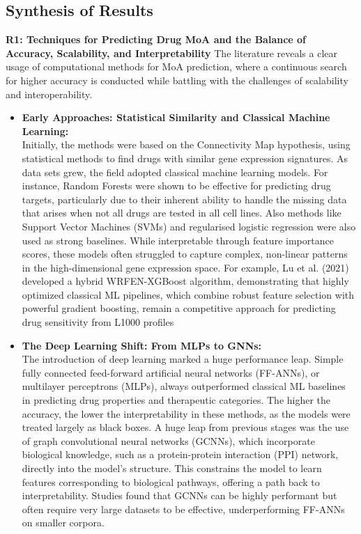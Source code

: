\documentclass[twocolumn]{article}
\begin{document}
\subsection{Synthesis of Results}
\textbf{R1: Techniques for Predicting Drug MoA and the Balance of Accuracy, Scalability, and Interpretability}
The literature reveals a clear usage of computational methods for MoA prediction, where a continuous search for higher accuracy is conducted while battling with the challenges of scalability and interoperability.
    \begin{itemize}
        \item \textbf{Early Approaches: Statistical Similarity and Classical Machine Learning:}
        \\
        Initially, the methods were based on the Connectivity Map hypothesis, using statistical methods to find drugs with similar gene expression signatures\cite{subramanian2017next,el2017integrative,liao2023open}. As data sets grew, the field adopted classical machine learning models. For instance, Random Forests were shown to be effective for predicting drug targets, particularly due to their inherent ability to handle the missing data that arises when not all drugs are tested in all cell lines\cite{mcdermott2019deep,subramanian2017next,duan2016l1000cds2}. Also methods like Support Vector Machines (SVMs) and regularised logistic regression were also used as strong baselines. While interpretable through feature importance scores, these models often struggled to capture complex, non-linear patterns in the high-dimensional gene expression space\cite{mcdermott2019deep}. For example, Lu et al. (2021) developed a hybrid WRFEN-XGBoost algorithm, demonstrating that highly optimized classical ML pipelines, which combine robust feature selection with powerful gradient boosting, remain a competitive approach for predicting drug sensitivity from L1000 profiles\cite{lu2021drug}
        \item \textbf{The Deep Learning Shift: From MLPs to GNNs:}
        \\
        The introduction of deep learning marked a huge performance leap. Simple fully connected feed-forward artificial neural networks (FF-ANNs), or multilayer perceptrons (MLPs), always outperformed classical ML baselines in predicting drug properties and therapeutic categories\cite{mcdermott2019deep}. The higher the accuracy, the lower the interpretability in these methods, as the models were treated largely as black boxes\cite{samal2022opportunities}. A huge leap from previous stages was the use of graph convolutional neural networks (GCNNs), which incorporate biological knowledge, such as a protein-protein interaction (PPI) network, directly into the model's structure. This constrains the model to learn features corresponding to biological pathways, offering a path back to interpretability.  Studies found that GCNNs can be highly performant but often require very large datasets to be effective, underperforming FF-ANNs on smaller corpora\cite{mcdermott2019deep}.
    

\end{itemize}
\end{document}
